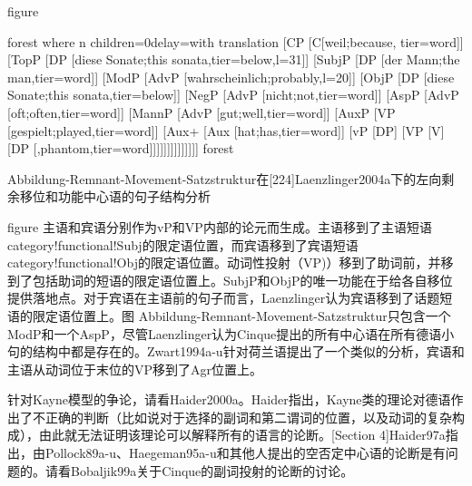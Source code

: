 figure

forest
where n children=0delay=with translation
[CP
	[C[weil;because, tier=word]]
	[TopP
		[DP [diese Sonate;this sonata,tier=below,l=31]]
		[SubjP
			[DP [der Mann;the man,tier=word]]
			[ModP
				[AdvP [wahrscheinlich;probably,l=20]]
				[ObjP
					[DP [diese Sonate;this sonata,tier=below]]
					[NegP
						[AdvP [nicht;not,tier=word]]
						[AspP
							[AdvP [oft;often,tier=word]]
							[MannP
								[AdvP [gut;well,tier=word]]
								[AuxP
									[VP [gespielt;played,tier=word]]
									[Aux+
										[Aux [hat;has,tier=word]]
										[vP
											[DP]
											[VP
												[V]
												[DP
                                                                                                  [,phantom,tier=word]]]]]]]]]]]]]]
forest

Abbildung-Remnant-Movement-Satzstruktur在[224]Laenzlinger2004a下的左向剩余移位和功能中心语的句子结构分析


figure
主语和宾语分别作为vP和VP内部的论元而生成。主语移到了主语短语category!functional!Subj的限定语位置，而宾语移到了宾语短语category!functional!Obj的限定语位置。动词性投射（VP)）移到了助词前，并移到了包括助词的短语的限定语位置上。SubjP和ObjP的唯一功能在于给各自移位提供落地点。对于宾语在主语前的句子而言，Laenzlinger认为宾语移到了话题短语的限定语位置上。图 Abbildung-Remnant-Movement-Satzstruktur只包含一个ModP和一个AspP，尽管Laenzlinger认为Cinque提出的所有中心语在所有德语小句的结构中都是存在的。Zwart1994a-u针对荷兰语提出了一个类似的分析，宾语和主语从动词位于末位的VP移到了Agr位置上。









针对Kayne模型的争论，请看Haider2000a。Haider指出，Kayne类的理论对德语作出了不正确的判断（比如说对于选择的副词和第二谓词的位置，以及动词的复杂构成），由此就无法证明该理论可以解释所有的语言的论断。[Section 4]Haider97a指出，由Pollock89a-u、Haegeman95a-u和其他人提出的空否定中心语的论断是有问题的。请看Bobaljik99a关于Cinque的副词投射的论断的讨论。







